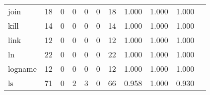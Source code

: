 \begin{longtable}{lp{1.20cm}p{1.20cm}p{1.20cm}p{1.20cm}p{1.20cm}p{1.20cm}p{1.20cm}p{1.20cm}p{1.20cm}p{1.20cm}}
join      &                                    18 &                                                  0 &                                                  0 &                                                  0 &                                                  0 &                                                 18 &                                         1.000 &                                              1.000 &                                              1.000 \\
kill      &                                    14 &                                                  0 &                                                  0 &                                                  0 &                                                  0 &                                                 14 &                                         1.000 &                                              1.000 &                                              1.000 \\
link      &                                    12 &                                                  0 &                                                  0 &                                                  0 &                                                  0 &                                                 12 &                                         1.000 &                                              1.000 &                                              1.000 \\
ln        &                                    22 &                                                  0 &                                                  0 &                                                  0 &                                                  0 &                                                 22 &                                         1.000 &                                              1.000 &                                              1.000 \\
logname   &                                    12 &                                                  0 &                                                  0 &                                                  0 &                                                  0 &                                                 12 &                                         1.000 &                                              1.000 &                                              1.000 \\
ls        &                                    71 &                                                  0 &                                                  2 &                                                  3 &                                                  0 &                                                 66 &                                         0.958 &                                              1.000 &                                              0.930 \\

\end{longtable}
